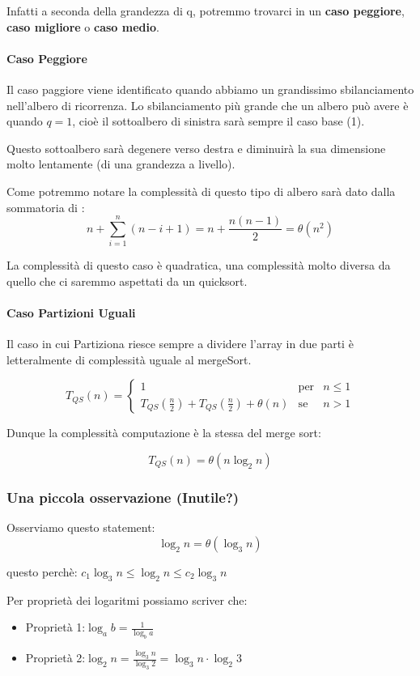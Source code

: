 Infatti a seconda della grandezza di q, potremmo trovarci in un \textbf{caso peggiore}, \textbf{caso migliore} o \textbf{caso medio}.

\paragraph{Caso Peggiore}
Il caso paggiore viene identificato quando abbiamo un grandissimo sbilanciamento nell'albero di ricorrenza. Lo sbilanciamento più grande che un albero può avere è quando $q=1$, cioè il sottoalbero di sinistra sarà sempre il caso base (1).\smallskip

Questo sottoalbero sarà degenere verso destra e diminuirà la sua dimensione molto lentamente (di una grandezza a livello).


\medskip
Come potremmo notare la complessità di questo tipo di albero sarà dato dalla sommatoria di :
$$n+\sum_{i=1}^{n}(n-i+1) = n + \frac{n(n-1)}{2} = \theta(n^2)$$

La complessità di questo caso è quadratica, una complessità molto diversa da quello che ci saremmo aspettati da un quicksort.

\paragraph{Caso Partizioni Uguali}
Il caso in cui Partiziona riesce sempre a dividere l'array in due parti è letteralmente di complessità uguale al mergeSort.

$$T_{QS}(n) = \left\{ \begin{array}{rcl}
    1 &\mbox{per} & n\le 1\\
    T_{QS}(\frac{n}{2}) + T_{QS}(\frac{n}{2}) + \theta(n) & \mbox{se} & n>1
    \end{array}\right.$$

Dunque la complessità computazione è la stessa del merge sort:\smallskip

$$T_{QS}(n) = \theta(n\log_2 n)$$

\subsubsection{Una piccola osservazione (Inutile?)}
Osserviamo questo statement: 
$$\log_2 n = \theta(\log_3 n)$$

questo perchè: $c_1\log_3 n \le \log_2 n \le c_2 \log_3 n$

Per proprietà dei logaritmi possiamo scriver che:
\begin{itemize}
    \item Proprietà 1:$\log_a b = \frac{1}{\log_b a}$
    \item Proprietà 2:$\log_2 n = \frac{\log_3 n}{\log_3 2} = \log_3 n \cdot \log_2 3$
\end{itemize}

